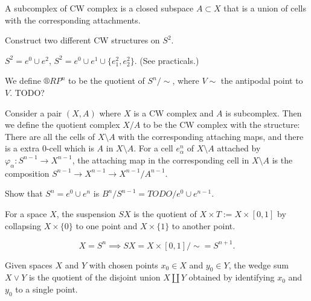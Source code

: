 \documentclass[12pt]{article}					%
\begin{document}
\begin{definice}
	A subcomplex of CW complex is a closed subspace $A \subset X$ that is a union of cells with the corresponding attachments.
\end{definice}

\begin{priklad}
	Construct two different CW structures on $S^2$.
	
	\begin{reseni}
		$S^2 = e^0 \cup e^2$, $S^2 = e^0 \cup e^1 \cup \{e^2_1, e^2_2\}$. (See practicals.)
	\end{reseni}
\end{priklad}

\begin{priklad}
	We define $®RP^n$ to be the quotient of $S^n / \sim$, where $V \sim $ the antipodal point to $V$. TODO?
\end{priklad}

\begin{definice}
	Consider a pair $(X, A)$ where $X$ is a CW complex and $A$ is subcomplex. Then we define the quotient complex $X / A$ to be the CW complex with the structure: There are all the cells of $X \setminus A$ with the corresponding attaching maps, and there is a extra $0$-cell which is $A$ in $X \setminus A$. For a cell $e_α^n$ of $X \setminus A$ attached by $φ_α: S^{n-1} \rightarrow X^{n - 1}$, the attaching map in the corresponding cell in $X \setminus A$ is the composition $S^{n-1} \rightarrow X^{n-1} \rightarrow X^{n-1} / A^{n-1}$.
\end{definice}

\begin{priklad}
	Show that $S^n = e^0 \cup e^n$ is $B^n / S^{n-1} = TODO / e^0 \cup e^{n-1}$.
\end{priklad}


\begin{definice}[Suspension]
	For a space $X$, the suspension $SX$ is the quotient of $X \times T := X \times [0, 1]$ by collapsing $X \times \{0\}$ to one point and $X \times \{1\}$ to another point.

	\begin{prikladyin}[Motivation]
		$$ X = S^n \implies SX = X \times [0, 1] / \sim = S^{n+1}. $$
	\end{prikladyin}
\end{definice}

\begin{definice}
	Given spaces $X$ and $Y$ with chosen points $x_0 \in X$ and $y_0 \in Y$, the wedge sum $X \vee Y$ is the quotient of the disjoint union $X \coprod Y$ obtained by identifying $x_0$ and $y_0$ to a single point.
\end{definice}
\end{document}
